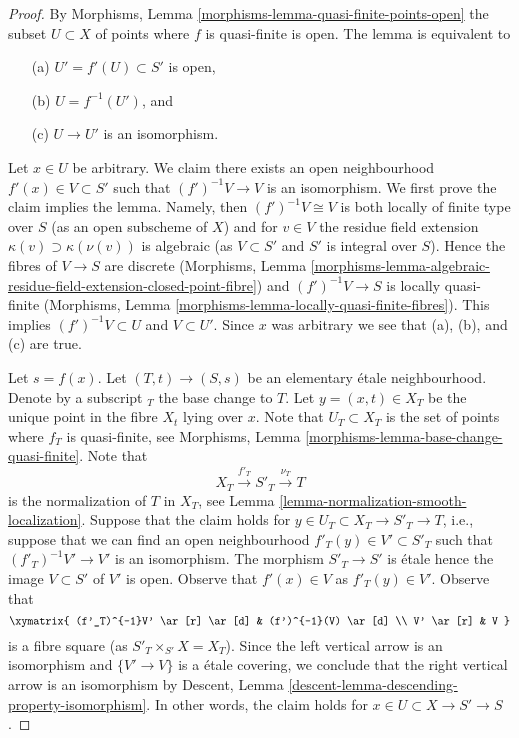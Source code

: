 \begin{proof}
By Morphisms, Lemma \ref{morphisms-lemma-quasi-finite-points-open}
the subset $U \subset X$ of points where $f$ is quasi-finite is open.
The lemma is equivalent to
\begin{enumerate}
\item[(a)] $U' = f'(U) \subset S'$ is open,
\item[(b)] $U = f^{-1}(U')$, and
\item[(c)] $U \to U'$ is an isomorphism.
\end{enumerate}
Let $x \in U$ be arbitrary. We claim there exists an open
neighbourhood $f'(x) \in V \subset S'$ such that $(f')^{-1}V \to V$ is an
isomorphism. We first prove the claim implies the lemma.
Namely, then $(f')^{-1}V \cong V$ is both locally of finite
type over $S$ (as an open subscheme of $X$) and for $v \in V$ the residue
field extension $\kappa(v) \supset \kappa(\nu(v))$ is algebraic (as
$V \subset S'$ and $S'$ is integral over $S$). Hence the fibres
of $V \to S$ are discrete (Morphisms, Lemma
\ref{morphisms-lemma-algebraic-residue-field-extension-closed-point-fibre})
and $(f')^{-1}V \to S$ is locally quasi-finite
(Morphisms, Lemma \ref{morphisms-lemma-locally-quasi-finite-fibres}).
This implies $(f')^{-1}V \subset U$ and $V \subset U'$. Since $x$ was
arbitrary we see that (a), (b), and (c) are true.

\medskip\noindent
Let $s = f(x)$. Let $(T, t) \to (S, s)$ be an elementary \'etale
neighbourhood. Denote by a subscript ${}_T$ the base change to $T$.
Let $y = (x, t) \in X_T$ be the unique point in
the fibre $X_t$ lying over $x$. Note that $U_T \subset X_T$
is the set of points where $f_T$ is quasi-finite, see
Morphisms, Lemma \ref{morphisms-lemma-base-change-quasi-finite}.
Note that
$$
X_T \xrightarrow{f'_T} S'_T \xrightarrow{\nu_T} T
$$
is the normalization of $T$ in $X_T$, see
Lemma \ref{lemma-normalization-smooth-localization}.
Suppose that the claim holds for $y \in U_T \subset X_T \to S'_T \to T$, i.e.,
suppose that we can find an open neighbourhood
$f'_T(y) \in V' \subset S'_T$ such that $(f'_T)^{-1}V' \to V'$ is an
isomorphism. The morphism $S'_T \to S'$ is \'etale hence the image
$V \subset S'$ of $V'$ is open. Observe that $f'(x) \in V$ as $f'_T(y) \in V'$.
Observe that
$$
\xymatrix{
(f'_T)^{-1}V' \ar[r] \ar[d] & (f')^{-1}(V) \ar[d] \\
V' \ar[r] & V
}
$$
is a fibre square (as $S'_T \times_{S'} X = X_T$).
Since the left vertical arrow is an isomorphism
and $\{V' \to V\}$ is a \'etale covering, we conclude that the right vertical
arrow is an isomorphism by
Descent, Lemma \ref{descent-lemma-descending-property-isomorphism}.
In other words, the claim holds for $x \in U \subset X \to S' \to S$.


\end{proof}
